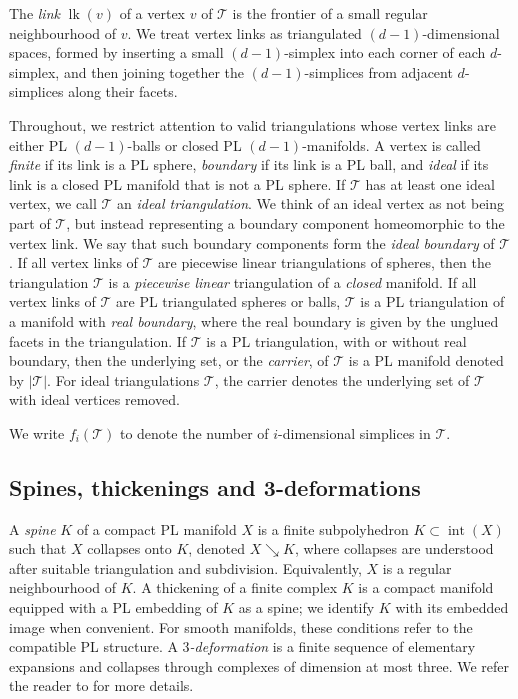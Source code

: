 \documentclass[a4paper,11pt,reqno]{amsart}
\theoremstyle{definition}
\theoremstyle{remark}
\newcommand{\tri}{\mathcal{T}}
\newcommand{\lk}{\operatorname{lk}}
\begin{document}
	The \emph{link} $\lk(v)$ of a vertex $v$ of $\tri$ is the frontier of a small regular neighbourhood of $v$. We treat vertex links as triangulated $(d-1)$-dimensional spaces, formed by inserting a small $(d-1)$-simplex into each corner of each $d$-simplex, and then joining together the $(d-1)$-simplices from adjacent $d$-simplices along their facets. 
	
	Throughout, we restrict attention to valid triangulations whose vertex links are either PL $(d-1)$-balls or closed PL $(d-1)$-manifolds.
	A vertex is called \emph{finite} if its link is a PL sphere, \emph{boundary} if its link is a PL ball, and \emph{ideal} if its link is a closed PL manifold that is not a PL sphere.
	If $\tri$ has at least one ideal vertex, we call $\tri$ an {\em ideal triangulation}. We think of an ideal vertex as not being part of $\tri$, but instead representing a boundary component homeomorphic to the vertex link. We say that such boundary components form the \emph{ideal boundary} of $\tri$. If all vertex links of $\tri$ are piecewise linear triangulations of spheres, then the triangulation $\tri$ is a \emph{piecewise linear} triangulation of a \emph{closed} manifold. If all vertex links of $\tri$ are PL triangulated spheres or balls, $\tri$ is a PL triangulation of a manifold with \emph{real boundary}, where the real boundary is given by the unglued facets in the triangulation. If $\tri$ is a PL triangulation, with or without real boundary, then the underlying set, or the {\em carrier}, of $\tri$ is a PL manifold denoted by $|\tri|$. For ideal triangulations $\tri$, the carrier denotes the underlying set of $\tri$ with ideal vertices removed.
	
	We write $f_i(\tri)$ to denote the number of $i$-dimensional simplices in $\tri$.
	
	
	\subsection*{Spines, thickenings and 3-deformations} 
	A \emph{spine} $K$ of a compact PL manifold $X$ is a finite subpolyhedron $K\subset\operatorname{int}(X)$ such that $X$ collapses onto $K$, denoted $X\searrow K$, where collapses are understood after suitable triangulation and subdivision. Equivalently, $X$ is a regular neighbourhood of $K$. A thickening of a finite complex $K$ is a compact manifold equipped with a PL embedding of $K$ as a spine; we identify $K$ with its embedded image when convenient. For smooth manifolds, these conditions refer to the compatible PL structure. A \emph{$3$-deformation} is a finite sequence of elementary expansions and collapses through complexes of dimension at most three. We refer the reader to \cite{Matveev-3Manifolds} for more details.
	
\end{document}
